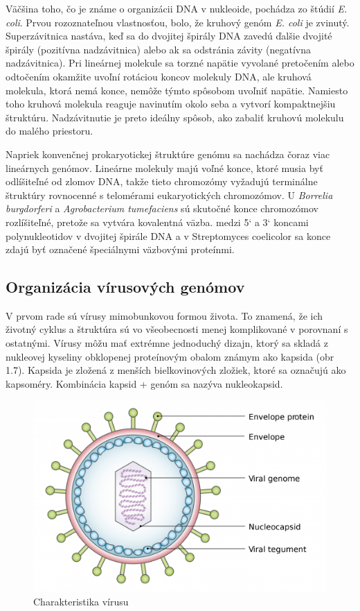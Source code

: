 Väčšina toho, čo je známe o organizácii DNA v nukleoide, pochádza zo štúdií \textit{E. coli}.
Prvou rozoznateľnou vlastnosťou, bolo, že kruhový genóm \textit{E. coli} je zvinutý.
Superzávitnica nastáva, keď sa do dvojitej špirály DNA zavedú ďalšie dvojité špirály (pozitívna nadzávitnica) alebo ak sa odstránia závity (negatívna nadzávitnica).
Pri lineárnej molekule sa torzné napätie vyvolané pretočením alebo odtočením okamžite uvoľní rotáciou koncov molekuly DNA, ale kruhová molekula, ktorá nemá konce, nemôže týmto spôsobom uvoľniť napätie.
Namiesto toho kruhová molekula reaguje navinutím okolo seba a vytvorí kompaktnejšiu štruktúru.
Nadzávitnutie je preto ideálny spôsob, ako zabaliť kruhovú molekulu do malého priestoru.

Napriek konvenčnej prokaryotickej štruktúre genómu sa nachádza čoraz viac lineárnych genómov.
Lineárne molekuly majú voľné konce, ktoré musia byť odlíšiteľné od zlomov DNA, takže tieto chromozómy vyžadujú terminálne štruktúry rovnocenné s telomérami eukaryotických chromozómov.
U \textit{Borrelia burgdorferi} a \textit{Agrobacterium tumefaciens} sú skutočné konce chromozómov rozlíšiteľné, pretože sa vytvára kovalentná väzba.
medzi 5` a 3` koncami polynukleotidov v dvojitej špirále DNA a v Streptomyces coelicolor sa konce zdajú byť označené špeciálnymi väzbovými proteínmi.

\subsection{Organizácia vírusových genómov}

V prvom rade sú vírusy mimobunkovou formou života. To znamená, že ich životný cyklus a štruktúra sú vo všeobecnosti menej komplikované v porovnaní s ostatnými.
Vírusy môžu mať extrémne jednoduchý dizajn, ktorý sa skladá z nukleovej kyseliny obklopenej proteínovým obalom známym ako kapsida (obr 1.7).
Kapsida je zložená z menších bielkovinových zložiek, ktoré sa označujú ako kapsoméry. Kombinácia kapsid + genóm sa nazýva nukleokapsid.

\begin{figure}[!ht]
	\centering
	\includegraphics[width=.75\textwidth]{figures/virus.png}
	\caption{Charakteristika vírusu \label{o:latex_friendly_zone}}
\end{figure}


